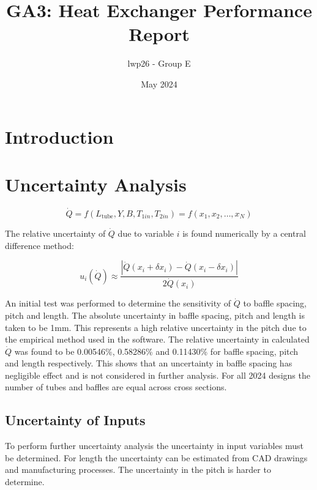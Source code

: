 \documentclass{article}
\begin{document}
\title{GA3: Heat Exchanger Performance Report}
\author{lwp26 - Group E}
\date{May 2024}
\maketitle 

\section{Introduction}

\section{Uncertainty Analysis}

\begin{equation}
    \dot{Q} = f(L_\text{tube}, Y, B, T_{1in}, T_{2in}) = f(x_1, x_2, \ldots, x_N)
\end{equation}

The relative uncertainty of $\dot{Q}$ due to variable $i$ is found numerically by a central difference method:

\begin{equation}
    u_i(\dot{Q}) \approx \frac{ \left| \dot{Q}(x_i + \delta x_i) - \dot{Q}(x_i - \delta x_i) \right|}{2\dot{Q}(x_i)} \label{eq:central_difference}
\end{equation}

An initial test was performed to determine the sensitivity of $\dot{Q}$ to baffle spacing, pitch and length.
The absolute uncertainty in baffle spacing, pitch and length is taken to be 1mm.
This represents a high relative uncertainty in the pitch due to the empirical method used in the software.
The relative uncertainty in calculated $\dot{Q}$ was found to be 0.00546\%, 0.58286\% and 0.11430\% for baffle spacing, pitch and length respectively.
This shows that an uncertainty in baffle spacing has negligible effect and is not considered in further analysis.
For all 2024 designs the number of tubes and baffles are equal across cross sections.

\subsection{Uncertainty of Inputs}

To perform further uncertainty analysis the uncertainty in input variables must be determined.
For length the uncertainty can be estimated from CAD drawings and manufacturing processes.
The uncertainty in the pitch is harder to determine.
\end{document}
